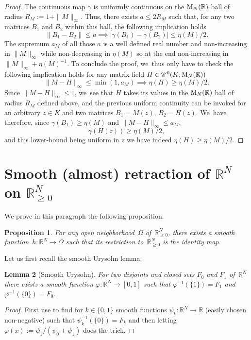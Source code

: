 \documentclass[JEP,XML,SOM,Unicode,published]{cedram}
\newtheorem{prop}{Proposition}[section]
\newtheorem{lem}[prop]{Lemma}
\theoremstyle{definition}
\newcommand\R{\mathbb{R}}
\let\ffi\varphi
\begin{document}
\begin{proof}
The continuous map $\gamma$ is uniformly continuous on the $\textnormal{M}_N(\R)$ ball of radius $R_M:=1+\|M\|_\infty$. Thus, there exists $a\leq 2 R_M$ such that, for any two matrices $B_1$ and $B_2$ within this ball, the following implication holds
\[
\| B_1 - B_2 \| \leq a \implies |\gamma(B_1)-\gamma(B_2)|\leq \eta(M)/2.
\]
The supremum $a_M$ of all those $a$ is a well defined real number and non-increasing in $\|M\|_\infty$ while non-decreasing in $\eta(M)$ so at the end non-increasing in $\|M\|_\infty+\eta(M)^{-1}$. To conclude the proof, we~thus only have to check the following implication holds for any matrix field $H\in\mathscr{C}^0(K;\textnormal{M}_N(\R))$
\[
\| M -H\|_\infty \leq \min(1,a_M) \implies \eta(H)\geq \eta(M)/2.
\]
Since $\|M-H\|_\infty \leq 1$, we~see that $H$ takes its values in the $\textnormal{M}_N(\R)$ ball of radius $R_M$ defined above, and the previous uniform continuity can be invoked for an arbitrary $z\in K$ and two matrices $B_1=M(z)$, $B_2=H(z)$. We~have therefore, since $\gamma(B_1)\geq \eta(M)$ and $\|M-H\|_\infty\leq a_M$,
\[
\gamma(H(z)) \geq \eta(M)/2,
\]
and this lower-bound being uniform in $z$ we have indeed $\eta(H)\geq \eta(M)/2$.
\end{proof}
\section{Smooth (almost) retraction of \texorpdfstring{$\R^N$ on $\R_{\geq 0}^N$}{RN}}\label{app:retract}
We prove in this paragraph the following proposition.
\begin{prop}\label{prop:quadrant}
For any open neighborhood~$\Omega$ of~$\R_{\geq 0}^N$, there exists a smooth function~${h:\R^N\to \Omega}$ such that its restriction to~$\R_{\geq 0}^N$ is the identity map.
\end{prop}

Let us first recall the smooth Urysohn lemma.
\begin{lem}[Smooth Urysohn]\label{lem:ury}
For two disjoints and closed sets $F_0$ and $F_1$ of~$\R^N$ there exists a smooth function $\ffi:\R^N\to[0,1]$ such that $\ffi^{-1}(\{1\}) = F_1$ and $\ffi^{-1}(\{0\})=F_0$.
\end{lem}
\begin{proof}
First use \cite[Th.\,2.29]{lee} to find for $k\!\in\!\{0,1\}$ smooth functions \hbox{$\psi_k:\R^N\to \R$} (easily chosen non-negative) such that $\psi^{-1}_k(\{0\})=F_k$ and then letting $\ffi(x):=\psi_1/(\psi_0+\psi_1)$ does the trick.
\end{proof}
\end{document}
